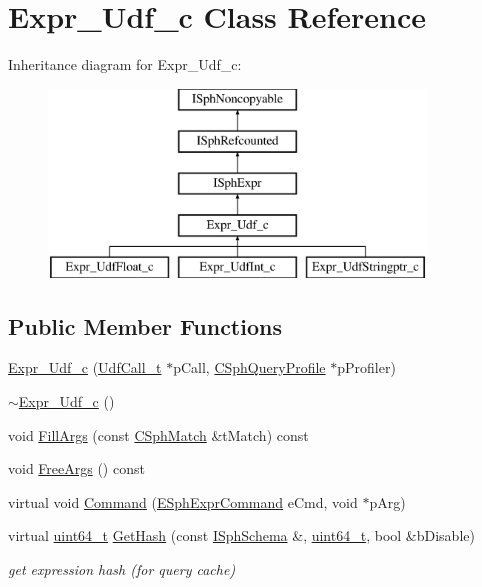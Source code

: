 \hypertarget{classExpr__Udf__c}{\section{Expr\-\_\-\-Udf\-\_\-c Class Reference}
\label{classExpr__Udf__c}
}
Inheritance diagram for Expr\-\_\-\-Udf\-\_\-c\-:\begin{figure}[H]
\begin{center}
\leavevmode
\includegraphics[height=5.000000cm]{classExpr__Udf__c}
\end{center}
\end{figure}
\subsection*{Public Member Functions}
\begin{DoxyCompactItemize}
\item 
\hyperlink{classExpr__Udf__c_ab432d951056f06a6d289bf9fb362288c}{Expr\-\_\-\-Udf\-\_\-c} (\hyperlink{structUdfCall__t}{Udf\-Call\-\_\-t} $\ast$p\-Call, \hyperlink{classCSphQueryProfile}{C\-Sph\-Query\-Profile} $\ast$p\-Profiler)
\item 
\hyperlink{classExpr__Udf__c_a28b45147f6acb98c66ec127b81c5dad1}{$\sim$\-Expr\-\_\-\-Udf\-\_\-c} ()
\item 
void \hyperlink{classExpr__Udf__c_a645505fb4c26a738459b267d2979ba11}{Fill\-Args} (const \hyperlink{classCSphMatch}{C\-Sph\-Match} \&t\-Match) const 
\item 
void \hyperlink{classExpr__Udf__c_aa6c8501a3d7378b41c3ad424f49098dc}{Free\-Args} () const 
\item 
virtual void \hyperlink{classExpr__Udf__c_af6334a653df4435b1674903dfb41e931}{Command} (\hyperlink{sphinxexpr_8h_a30be184fb07bd80c271360fc6094c818}{E\-Sph\-Expr\-Command} e\-Cmd, void $\ast$p\-Arg)
\item 
virtual \hyperlink{sphinxstd_8h_aaa5d1cd013383c889537491c3cfd9aad}{uint64\-\_\-t} \hyperlink{classExpr__Udf__c_a6fef537fbef35b5a4682f0473db89732}{Get\-Hash} (const \hyperlink{classISphSchema}{I\-Sph\-Schema} \&, \hyperlink{sphinxstd_8h_aaa5d1cd013383c889537491c3cfd9aad}{uint64\-\_\-t}, bool \&b\-Disable)
\begin{DoxyCompactList}\small\item\em get expression hash (for query cache) \end{DoxyCompactList}\end{DoxyCompactItemize}
